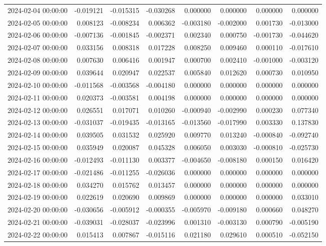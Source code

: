 \begin{tabular}{lrrrrrrr}
2024-02-04 00:00:00 & -0.019121 & -0.015315 & -0.030268 & 0.000000 & 0.000000 & 0.000000 & 0.000000 \\
2024-02-05 00:00:00 & 0.008123 & -0.008234 & 0.006362 & -0.003180 & -0.002000 & 0.001730 & -0.013000 \\
2024-02-06 00:00:00 & -0.007136 & -0.001845 & -0.002371 & 0.002340 & 0.000750 & -0.001730 & -0.044620 \\
2024-02-07 00:00:00 & 0.033156 & 0.008318 & 0.017228 & 0.008250 & 0.009460 & 0.000110 & -0.017610 \\
2024-02-08 00:00:00 & 0.007630 & 0.006416 & 0.001947 & 0.000700 & 0.002410 & -0.001000 & -0.003120 \\
2024-02-09 00:00:00 & 0.039644 & 0.020947 & 0.022537 & 0.005840 & 0.012620 & 0.000730 & 0.010950 \\
2024-02-10 00:00:00 & -0.011568 & -0.003568 & -0.004180 & 0.000000 & 0.000000 & 0.000000 & 0.000000 \\
2024-02-11 00:00:00 & 0.020373 & -0.003581 & 0.004198 & 0.000000 & 0.000000 & 0.000000 & 0.000000 \\
2024-02-12 00:00:00 & 0.026551 & 0.017071 & 0.010260 & -0.000940 & -0.002990 & 0.000230 & 0.077340 \\
2024-02-13 00:00:00 & -0.031037 & -0.019435 & -0.013165 & -0.013560 & -0.017990 & 0.003330 & 0.137830 \\
2024-02-14 00:00:00 & 0.039505 & 0.031532 & 0.025920 & 0.009770 & 0.013240 & -0.000840 & -0.092740 \\
2024-02-15 00:00:00 & 0.035949 & 0.020087 & 0.045328 & 0.006050 & 0.003030 & -0.000810 & -0.025730 \\
2024-02-16 00:00:00 & -0.012493 & -0.011130 & 0.003377 & -0.004650 & -0.008180 & 0.000150 & 0.016420 \\
2024-02-17 00:00:00 & -0.021486 & -0.011255 & -0.026036 & 0.000000 & 0.000000 & 0.000000 & 0.000000 \\
2024-02-18 00:00:00 & 0.034270 & 0.015762 & 0.013457 & 0.000000 & 0.000000 & 0.000000 & 0.000000 \\
2024-02-19 00:00:00 & 0.022619 & 0.020690 & 0.009869 & 0.000000 & 0.000000 & 0.000000 & 0.033010 \\
2024-02-20 00:00:00 & -0.030656 & -0.005912 & -0.000355 & -0.005970 & -0.009180 & 0.000660 & 0.048270 \\
2024-02-21 00:00:00 & -0.039031 & -0.028037 & -0.023996 & 0.001310 & -0.003130 & 0.000790 & -0.005190 \\
2024-02-22 00:00:00 & 0.015413 & 0.007867 & -0.015116 & 0.021180 & 0.029610 & 0.000510 & -0.052150 \\

\end{tabular}
